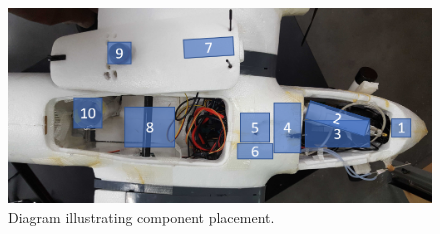 \documentclass[]{auvsi_doc}
\begin{document}
	\begin{figure}[h!]
		\centering
		\includegraphics[width=.9\columnwidth]{figs/ComponentsPlacement.png}
		\caption{Diagram illustrating component placement.}
		\label{fig:components}
	\end{figure}
	
	
\end{document}
